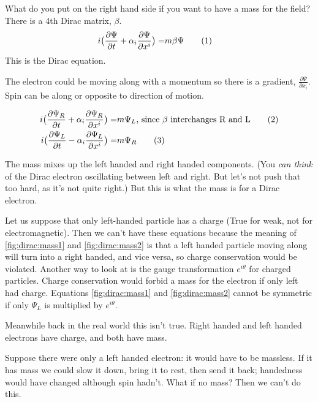 \documentclass[]{article}
\newcommand\numberthis{\addtocounter{equation}{1}\tag{\theequation}}
\begin{document}
 What do you put on the right hand side if you want to have a mass for the field? There is a 4th Dirac matrix, $\beta$.
 \begin{align*}
 	i \big(\frac{\partial \Psi}{\partial t} + \alpha_i \frac{\partial \Psi}{\partial 	x^i}\big) =&m \beta \Psi \numberthis \label{eq:dirac}
 \end{align*}
 This is the Dirac equation.
 
 The electron could be moving along with a momentum so there is a gradient, $\frac{\partial \Psi}{\partial x_i}$. Spin can be along or opposite to direction of motion. 
 
 \begin{align*}
 	i \big(\frac{\partial \Psi_R}{\partial t} + \alpha_i \frac{\partial \Psi_R}{\partial 	x^i}\big) =& m \Psi_L \text{, since $\beta$ interchanges R and L} \numberthis \label{fig:dirac:mass1}\\
 	i \big(\frac{\partial \Psi_L}{\partial t} - \alpha_i \frac{\partial \Psi_L}{\partial x^i}\big) =& m \Psi_R \numberthis \label{fig:dirac:mass2}
 \end{align*}
 
 The mass mixes up the left handed and right handed components. (You \emph{can think} of the Dirac electron oscillating between left and right. But let's not push that too hard, as it's not quite right.) But this is what the mass is for a Dirac electron.
 
 Let us suppose that only left-handed particle has a charge (True for weak, not for electromagnetic). Then we can't have these equations because the meaning of \eqref{fig:dirac:mass1} and \eqref{fig:dirac:mass2} is that a left handed particle moving along will turn into a right handed, and vice versa, so charge conservation would be violated. Another way to look at is the gauge transformation $e^{i\theta}$ for charged particles. Charge conservation would forbid a mass for the electron if only left had charge. Equations \eqref{fig:dirac:mass1} and \eqref{fig:dirac:mass2} cannot be symmetric if only $\Psi_L$ is multiplied by $e^{i\theta}$.
 
 Meanwhile back in the real world this isn't true. Right handed and left handed electrons have charge, and both have mass.
 
 Suppose there were only a left handed electron: it would have to be massless. If it has mass we could slow it down, bring it to rest, then send it back; handedness would have changed although spin hadn't. What if no mass? Then we can't do this.
 
\end{document}
